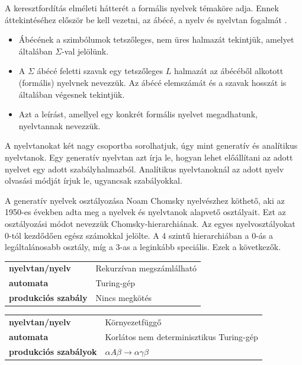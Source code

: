 

A keresztfordítás elméleti hátterét a formális nyelvek témaköre adja.
Ennek áttekintéséhez először be kell vezetni, az ábécé, a nyelv és nyelvtan fogalmát \cite{formalis}.
\begin{itemize}
\item Ábécének a szimbólumok tetszőleges, nem üres halmazát tekintjük, amelyet általában $\Sigma$-val jelölünk.
\item A $\Sigma$ ábécé feletti szavak egy tetszőleges $L$ halmazát az ábécéből alkotott (formális) nyelvnek nevezzük.
Az ábécé elemszámát és a szavak hosszát is általában végesnek tekintjük.
\item Azt a leírást, amellyel egy konkrét formális nyelvet megadhatunk, nyelvtannak nevezzük.
\end{itemize}
\cite{formalis}

A nyelvtanokat két nagy csoportba sorolhatjuk, úgy mint generatív és analítikus nyelvtanok.
Egy generatív nyelvtan azt írja le, hogyan lehet előállítani az adott nyelvet egy adott szabályhalmazból.
Analítikus nyelvtanoknál az adott nyelv olvasási módját írjuk le, ugyancsak szabályokkal.

A generatív nyelvek osztályozása Noam Chomsky nyelvészhez köthető, aki az 1950-es években adta meg a nyelvek és nyelvtanok alapvető osztályait. Ezt az osztályozási módot nevezzük Chomsky-hierarchiának. Az egyes nyelvosztályokat 0-tól kezdődően egész számokkal jelölte. A 4 szintű hierarchiában a 0-ás a legáltalánosabb osztály, míg a 3-as a leginkább speciális. Ezek a következők.


\begin{tabular}{ll}
\textbf{nyelvtan/nyelv} & Rekurzívan megszámlálható \\
\textbf{automata} & Turing-gép \\
\textbf{produkciós szabály} & Nincs megkötés \\
\end{tabular}


\begin{tabular}{ll}
\textbf{nyelvtan/nyelv} & Környezetfüggő \\
\textbf{automata} & Korlátos nem determinisztikus Turing-gép \\
\textbf{produkciós szabályok} & $\alpha A \beta \rightarrow \alpha \gamma \beta$ \\
\end{tabular}

